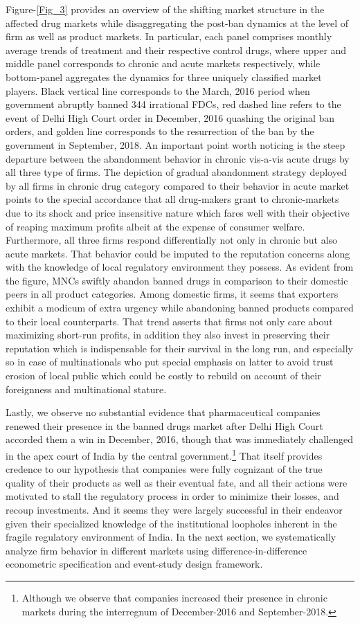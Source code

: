 \documentclass[AER]{AEA}
\theoremstyle{theorem}
\begin{document}
Figure-\ref{Fig_3} provides an overview of the shifting market structure in the affected drug markets while disaggregating the post-ban dynamics at the level of firm as well as product markets. In particular, each panel comprises monthly average trends of treatment and their respective control drugs, where upper and middle panel corresponds to chronic and acute markets respectively, while bottom-panel aggregates the dynamics for three uniquely classified market players. Black vertical line  corresponds to the March, 2016 period when government abruptly banned 344 irrational FDCs, red dashed line refers to the event of Delhi High Court  order in December, 2016 quashing the original ban orders, and golden line corresponds to the resurrection of the ban by the government in September, 2018. An important point worth noticing is the steep departure between the abandonment behavior in chronic vis-a-vis acute drugs by all three type of firms. The depiction of gradual abandonment strategy deployed by all firms in chronic drug category compared to their behavior in acute market points to the special accordance that all drug-makers grant to chronic-markets due to its shock and price insensitive nature which fares well with their objective of reaping maximum profits albeit at the expense of consumer welfare. Furthermore, all three firms respond differentially not only in chronic but also acute markets. That behavior could be imputed to the reputation concerns along with the knowledge of local regulatory environment they possess. As evident from the figure, MNCs swiftly abandon banned drugs in comparison to their domestic peers in all product categories. Among domestic firms, it seems that exporters exhibit a modicum of extra urgency while abandoning banned products compared to their local counterparts. That trend asserts  that firms not only care about maximizing short-run profits, in addition they also invest in preserving their reputation which is indispensable for their survival in the long run, and especially so in case of  multinationals who put special emphasis on latter to avoid trust erosion of local public which could be costly to rebuild on account of their foreignness and multinational stature.

Lastly, we observe no substantial evidence that pharmaceutical companies renewed their presence in the banned drugs market after Delhi High Court accorded them a win in December, 2016, though that was immediately challenged in the apex court of India by the central government.\footnote{Although we observe that companies increased their presence in chronic markets during the interregnum of December-2016 and September-2018.} That itself provides credence to our hypothesis that companies were fully cognizant of the true quality of their products as well as their eventual fate, and all their actions were motivated to stall the regulatory process in order to minimize their losses, and recoup investments. And it seems they were largely successful in their endeavor given their specialized knowledge of the institutional loopholes inherent in the fragile regulatory environment of India. In the next section, we systematically analyze firm behavior in different markets using difference-in-difference econometric specification and event-study design framework.
\end{document}
